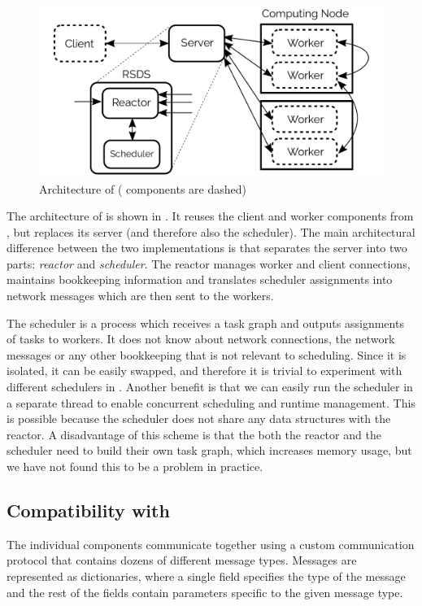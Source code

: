 \begin{figure}[h]
	\centering
	\includegraphics[width=0.8\linewidth]{./imgs/rsds/rsds-architecture}
	\caption{Architecture of \rsds{} (\dask{} components are dashed)}
	\label{fig:rsds-architecture}
\end{figure}

The architecture of \rsds{} is shown in . It reuses
the client and worker components from \dask{}, but replaces its server (and
therefore also the scheduler). The main architectural difference between the two implementations is
that \rsds{} separates the server into two parts: \emph{reactor}
and \emph{scheduler}. The reactor manages worker and client connections, maintains
bookkeeping information and translates scheduler assignments into \dask{}
network messages which are then sent to the workers.

The scheduler is a process which receives a task graph and outputs assignments of tasks to workers.
It does not know about network connections, the \dask{} network messages or any
other bookkeeping that is not relevant to scheduling. Since it is isolated, it can be easily
swapped, and therefore it is trivial to experiment with different schedulers in
\rsds{}. Another benefit is that we can easily run the scheduler in a separate
thread to enable concurrent scheduling and runtime management. This is possible because the
scheduler does not share any data structures with the reactor. A disadvantage of this scheme is
that the both the reactor and the scheduler need to build their own task graph, which increases
memory usage, but we have not found this to be a problem in practice.

\subsection*{Compatibility with \dask{}}
The individual \dask{} components communicate together using a custom
communication protocol that contains dozens of different message types. Messages are represented as
dictionaries, where a single field specifies the type of the message and the rest of the fields
contain parameters specific to the given message type.

